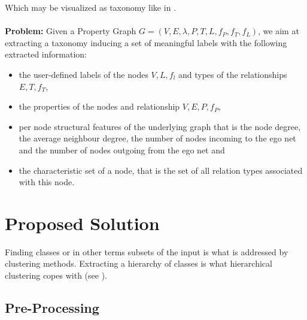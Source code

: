 \noindent Which may be visualized as taxonomy like in . \\
 \\
 
\noindent \textbf{Problem:} Given a Property Graph  $G = (V, E, \lambda, P, T, L, f_P, f_T, f_L)$, we aim at extracting a taxonomy inducing a set of meaningful labels with the following extracted information:
\begin{itemize}
    \item the user-defined labels of the nodes $V, L, f_l$ and types of the relationships $E, T, f_T$,
    \item the properties of the nodes and relationship $V, E, P, f_P$,
    \item per node structural features of the underlying graph that is the node degree, the average neighbour degree, the number of nodes incoming to the ego net and the number of nodes outgoing from the ego net and
    \item the characteristic set of a node, that is the set of all relation types associated with this node.
\end{itemize}

\section{Proposed Solution}
Finding classes or in other terms subsets of the input is what is addressed by clustering methods. Extracting a hierarchy of classes is what hierarchical clustering copes with (see ). \\



\subsection{Pre-Processing}\label{\positionnumber}
